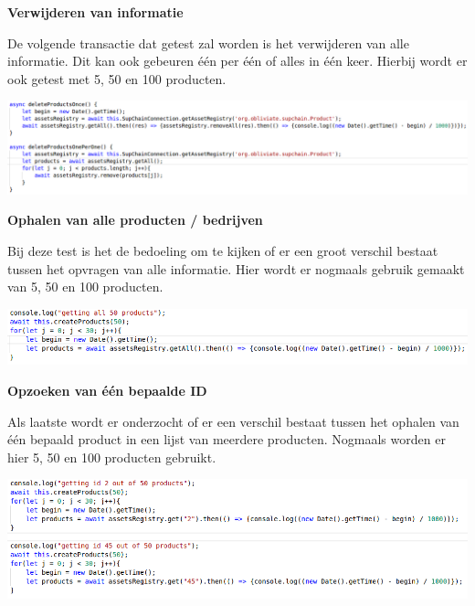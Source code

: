 \documentclass[fleqn,a4paper,12pt]{book}
\begin{document}
\textbf{Verwijderen van informatie}

De volgende transactie dat getest zal worden is het verwijderen van alle informatie. Dit kan ook gebeuren één per één of alles in één keer. Hierbij wordt er ook getest met 5, 50 en 100 producten.

\begin{center}
	\includegraphics[width=14cm]{img/test-function-removeProductOnce}\\[1cm]
\end{center}

\textbf{Ophalen van alle producten / bedrijven}

Bij deze test is het de bedoeling om te kijken of er een groot verschil bestaat tussen het opvragen van alle informatie. Hier wordt er nogmaals gebruik gemaakt van 5, 50 en 100 producten.

\begin{center}
	\includegraphics[width=14cm]{img/test-function-getAllProducts}\\[1cm]
\end{center}

\textbf{Opzoeken van één bepaalde ID}

Als laatste wordt er onderzocht of er een verschil bestaat tussen het ophalen van één bepaald product in een lijst van meerdere producten. Nogmaals worden er hier 5, 50 en 100 producten gebruikt.

\begin{center}
	\includegraphics[width=14cm]{img/test-function-getID}\\[1cm]
\end{center}
\end{document}
